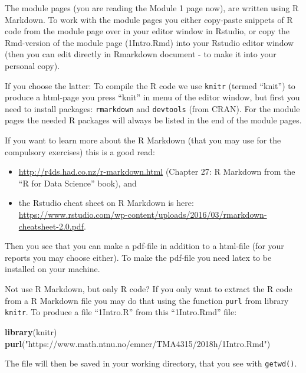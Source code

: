 \documentclass[
  ignorenonframetext,
]{beamer}
\newenvironment{Shaded}{\begin{snugshade}}{\end{snugshade}}
\newcommand{\FunctionTok}[1]{\textcolor[rgb]{0.13,0.29,0.53}{\textbf{#1}}}
\newcommand{\NormalTok}[1]{#1}
\newcommand{\StringTok}[1]{\textcolor[rgb]{0.31,0.60,0.02}{#1}}
\begin{document}
\begin{frame}[fragile]
The module pages (you are reading the Module 1 page now), are written
using R Markdown. To work with the module pages you either copy-paste
snippets of R code from the module page over in your editor window in
Rstudio, or copy the Rmd-version of the module page (1Intro.Rmd) into
your Rstudio editor window (then you can edit directly in Rmarkdown
document - to make it into your personal copy).

If you choose the latter: To compile the R code we use \texttt{knitr}
(termed ``knit'') to produce a html-page you press ``knit'' in menu of
the editor window, but first you need to install packages:
\texttt{rmarkdown} and \texttt{devtools} (from CRAN). For the module
pages the needed R packages will always be listed in the end of the
module pages.

If you want to learn more about the R Markdown (that you may use for the
compulsory exercises) this is a good read:

\begin{itemize}
\item
  \url{http://r4ds.had.co.nz/r-markdown.html} (Chapter 27: R Markdown
  from the ``R for Data Science'' book), and
\item
  the Rstudio cheat sheet on R Markdown is here:
  \url{https://www.rstudio.com/wp-content/uploads/2016/03/rmarkdown-cheatsheet-2.0.pdf}.
\end{itemize}

Then you see that you can make a pdf-file in addition to a html-file
(for your reports you may choose either). To make the pdf-file you need
latex to be installed on your machine.
\end{frame}

\begin{frame}[fragile]
\begin{block}{Not use R Markdown, but only R code?}
\protect\hypertarget{not-use-r-markdown-but-only-r-code}{}
If you only want to extract the R code from a R Markdown file you may do
that using the function \texttt{purl} from library \texttt{knitr}. To
produce a file ``1Intro.R'' from this ``1Intro.Rmd'' file:

\begin{Shaded}
\begin{Highlighting}[]
\FunctionTok{library}\NormalTok{(knitr)}
\FunctionTok{purl}\NormalTok{(}\StringTok{"https://www.math.ntnu.no/emner/TMA4315/2018h/1Intro.Rmd"}\NormalTok{)}
\end{Highlighting}
\end{Shaded}

The file will then be saved in your working directory, that you see with
\texttt{getwd()}.
\end{block}
\end{frame}
\end{document}
